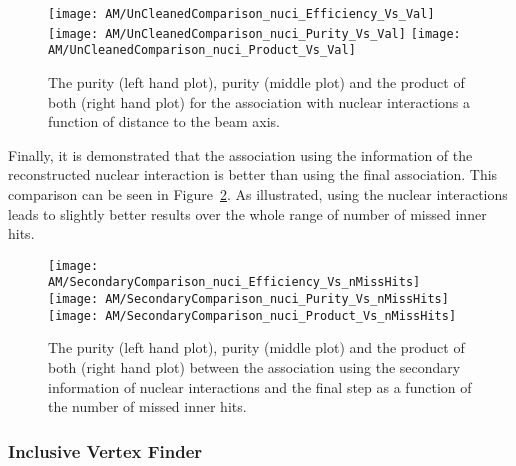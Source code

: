 \begin{figure}[!ht]
  \centering
  \texttt{[image: AM/UnCleanedComparison\_nuci\_Efficiency\_Vs\_Val]}
  \texttt{[image: AM/UnCleanedComparison\_nuci\_Purity\_Vs\_Val]}
  \texttt{[image: AM/UnCleanedComparison\_nuci\_Product\_Vs\_Val]}
  \caption[Efficiency, purity and their product for the association with nuclear interactions a function of distance to the beam axis]{The purity (left hand plot), purity (middle plot) and the product of both (right hand plot) for the association with nuclear interactions a function of distance to the beam axis. \label{plot:AMWFSVnuciEffAndPurRT}}
\end{figure}

Finally, it is demonstrated that the association using the information of the reconstructed nuclear interaction is better than using the final association. This comparison can be seen in Figure~\ref{plot:AMWFSVnuciEffAndPurVsFA}. As illustrated, using the nuclear interactions leads to slightly better results over the whole range of number of missed inner hits.

\begin{figure}[!ht]
  \centering
  \texttt{[image: AM/SecondaryComparison\_nuci\_Efficiency\_Vs\_nMissHits]}
  \texttt{[image: AM/SecondaryComparison\_nuci\_Purity\_Vs\_nMissHits]}
  \texttt{[image: AM/SecondaryComparison\_nuci\_Product\_Vs\_nMissHits]}
  \caption[Efficiency, purity and their product for the association with nuclear interactions vs final association as a function of missed inner hits]{The purity (left hand plot), purity (middle plot) and the product of both (right hand plot) between the association using the secondary information of nuclear interactions and the final step as a function of the number of missed inner hits.\label{plot:AMWFSVnuciEffAndPurVsFA}}
\end{figure}

\subsubsection{Inclusive Vertex Finder \label{sec:AMWFSVivf}}

